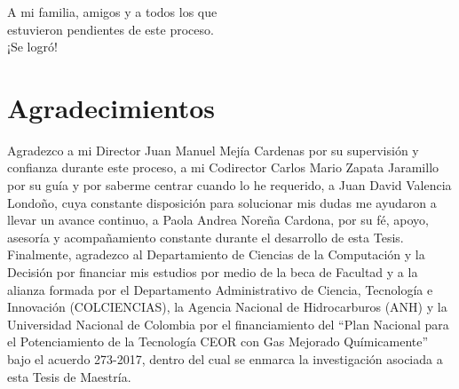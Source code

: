 \newpage{\pagestyle{empty}\cleardoublepage}

\newpage
\thispagestyle{empty} \textbf{}\normalsize
\\\\\\%
~\\[4.0cm]

\begin{flushright}
\begin{minipage}{8cm}
    \noindent
        \small
        ~\\[2.0cm]
        A mi familia, amigos y a todos los que\\
        estuvieron pendientes de este proceso.\\
        ¡Se logró!
        
\end{minipage}
\end{flushright}

\chapter*{Agradecimientos}
Agradezco a mi Director Juan Manuel Mejía Cardenas por su supervisión y confianza durante este proceso, a mi Codirector Carlos Mario Zapata Jaramillo por su guía y por saberme centrar cuando lo he requerido, a Juan David Valencia Londoño, cuya constante disposición para solucionar mis dudas me ayudaron a llevar un avance continuo, a Paola Andrea Nore\~{n}a Cardona, por su fé, apoyo, asesoría y acompañamiento constante durante el desarrollo de esta Tesis.\\

Finalmente, agradezco al Departamiento de Ciencias de la Computación y la Decisión por financiar mis estudios por medio de la beca de Facultad y a la alianza formada por el Departamento Administrativo de Ciencia, Tecnología e Innovación (COLCIENCIAS), la Agencia Nacional de Hidrocarburos (ANH) y la Universidad Nacional de Colombia por el financiamiento del ``Plan Nacional para el Potenciamiento de la Tecnología CEOR con Gas Mejorado Químicamente'' bajo el acuerdo 273-2017, dentro del cual se enmarca la investigación asociada a esta Tesis de Maestría.

